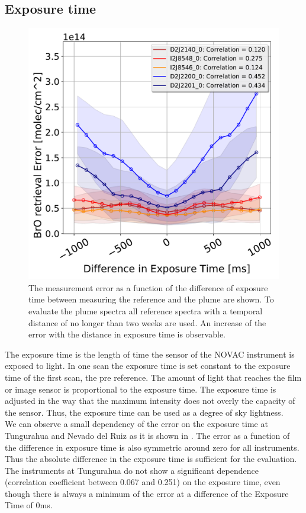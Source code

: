 \subsection{Exposure time}
\begin{figure}
	\centering
	\includegraphics[width=0.7\linewidth]{Bilder/DiffExpTimeallInstruments}
	\caption{The   measurement error as a function of the difference of exposure time between measuring the reference and the plume are shown. To evaluate the plume spectra all reference spectra with a temporal distance of no longer than two weeks are used. An increase of the  error with the distance in exposure time is observable.}
	\label{fig:diffexptime}
\end{figure}
The  exposure time is the length of time the sensor of the NOVAC instrument is exposed to light. In one scan the exposure time is set constant to the exposure time of the first scan, the pre reference. The amount of light that reaches the film or image sensor is proportional to the exposure time. The exposure time is adjusted in the way that the maximum intensity does not overly the capacity of the sensor. Thus, the exposure time can be used as a degree of sky lightness.\\
We can observe a small dependency of the  error on the exposure time at Tungurahua and Nevado del Ruiz as it is shown in . The   error as a function of the difference in exposure time is also symmetric around zero for all instruments. Thus the absolute difference in the exposure time is sufficient for the evaluation.\\
The instruments at Tungurahua do not show a significant dependence (correlation coefficient between 0.067 and 0.251) on the exposure time, even though there is always a minimum of the  error at a difference of the Exposure Time of 0ms.\\

